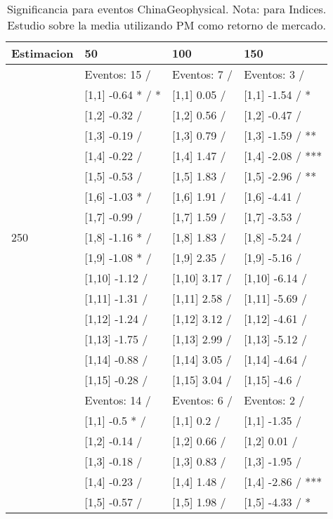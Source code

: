 \begin{table}

\caption{Significancia para eventos ChinaGeophysical. Nota: para Indices. Estudio sobre la media utilizando PM como retorno de mercado.}
\centering
\begin{tabular}[t]{llll}
\toprule
Estimacion & 50 & 100 & 150\\
\midrule
 & Eventos:  15 / & Eventos:  7 / & Eventos:  3 /\\
 & {}[1,1] -0.64 * / * & {}[1,1] 0.05  / & {}[1,1] -1.54  / *\\
 & {}[1,2] -0.32  / & {}[1,2] 0.56  / & {}[1,2] -0.47  /\\
 & {}[1,3] -0.19  / & {}[1,3] 0.79  / & {}[1,3] -1.59  / **\\
 & {}[1,4] -0.22  / & {}[1,4] 1.47  / & {}[1,4] -2.08  / ***\\
\addlinespace
 & {}[1,5] -0.53  / & {}[1,5] 1.83  / & {}[1,5] -2.96  / **\\
 & {}[1,6] -1.03 * / & {}[1,6] 1.91  / & {}[1,6] -4.41  /\\
 & {}[1,7] -0.99  / & {}[1,7] 1.59  / & {}[1,7] -3.53  /\\
250 & {}[1,8] -1.16 * / & {}[1,8] 1.83  / & {}[1,8] -5.24  /\\
 & {}[1,9] -1.08 * / & {}[1,9] 2.35  / & {}[1,9] -5.16  /\\
\addlinespace
 & {}[1,10] -1.12  / & {}[1,10] 3.17  / & {}[1,10] -6.14  /\\
 & {}[1,11] -1.31  / & {}[1,11] 2.58  / & {}[1,11] -5.69  /\\
 & {}[1,12] -1.24  / & {}[1,12] 3.12  / & {}[1,12] -4.61  /\\
 & {}[1,13] -1.75  / & {}[1,13] 2.99  / & {}[1,13] -5.12  /\\
 & {}[1,14] -0.88  / & {}[1,14] 3.05  / & {}[1,14] -4.64  /\\
\addlinespace
 & {}[1,15] -0.28  / & {}[1,15] 3.04  / & {}[1,15] -4.6  /\\
 & Eventos:  14 / & Eventos:  6 / & Eventos:  2 /\\
 & {}[1,1] -0.5 * / & {}[1,1] 0.2  / & {}[1,1] -1.35  /\\
 & {}[1,2] -0.14  / & {}[1,2] 0.66  / & {}[1,2] 0.01  /\\
 & {}[1,3] -0.18  / & {}[1,3] 0.83  / & {}[1,3] -1.95  /\\
\addlinespace
 & {}[1,4] -0.23  / & {}[1,4] 1.48  / & {}[1,4] -2.86  / ***\\
 & {}[1,5] -0.57  / & {}[1,5] 1.98  / & {}[1,5] -4.33  / *\\

\end{tabular}
\end{table}
